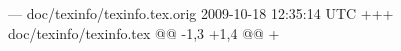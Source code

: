 --- doc/texinfo/texinfo.tex.orig	2009-10-18 12:35:14 UTC
+++ doc/texinfo/texinfo.tex
@@ -1,3 +1,4 @@
+\let\pdfoutput\undefined
